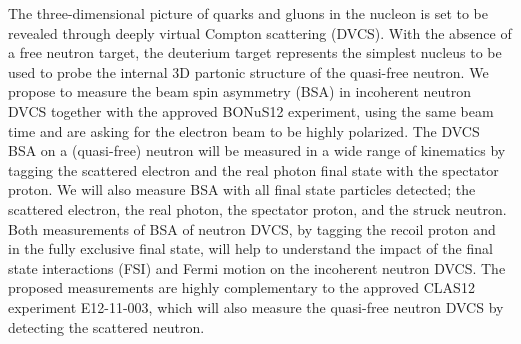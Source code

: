 %
The three-dimensional picture of quarks and gluons in the nucleon is set to be 
revealed through deeply virtual Compton scattering (DVCS). With the absence of 
a free neutron target, the deuterium target represents the simplest nucleus to 
be used to probe the internal 3D partonic structure of the quasi-free neutron.  
We propose to measure the beam spin asymmetry (BSA) in incoherent neutron DVCS 
together with the approved BONuS12 experiment, using the same beam time and are 
asking for the electron beam to be highly polarized. The DVCS BSA on a 
(quasi-free) neutron will be measured in a wide range of kinematics by tagging 
the scattered electron and the real photon final state with the spectator 
proton. We will also measure BSA with all final state particles detected; the 
scattered electron, the real photon, the spectator proton, and the struck 
neutron. Both measurements of BSA of neutron DVCS, by tagging the recoil proton 
and in the fully exclusive final state, will help to understand the impact of 
the final state interactions (FSI) and Fermi motion on the incoherent neutron 
DVCS. The proposed measurements are highly complementary to the approved CLAS12 
experiment E12-11-003, which will also measure the quasi-free neutron DVCS by 
detecting the scattered neutron.
